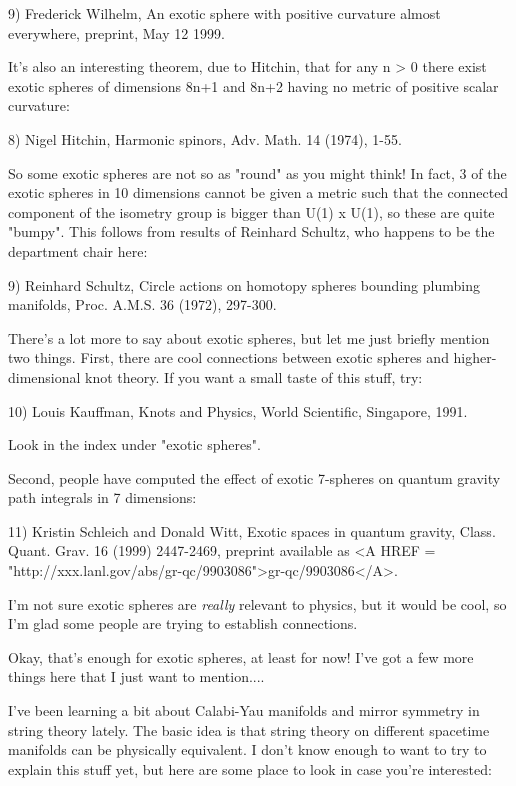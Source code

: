 9) Frederick Wilhelm, An exotic sphere with positive curvature 
almost everywhere, preprint, May 12 1999.

It's also an interesting theorem, due to Hitchin, that for any n > 0
there exist exotic spheres of dimensions 8n+1 and 8n+2 having no metric
of positive scalar curvature:

8) Nigel Hitchin, Harmonic spinors, Adv. Math. 14 (1974), 1-55.
 
So some exotic spheres are not so as "round" as you might think!   
In fact, 3 of the exotic spheres in 10 dimensions cannot be given a 
metric such that the connected component of the isometry group is 
bigger than U(1) x U(1), so these are quite "bumpy".  This follows 
from results of Reinhard Schultz, who happens to be the department 
chair here:

9) Reinhard Schultz, Circle actions on homotopy spheres bounding
plumbing manifolds, Proc. A.M.S. 36 (1972), 297-300.

There's a lot more to say about exotic spheres, but let me just
briefly mention two things.  First, there are cool connections 
between exotic spheres and higher-dimensional knot theory.  If 
you want a small taste of this stuff, try:

10) Louis Kauffman, Knots and Physics, World Scientific, Singapore,
1991.

Look in the index under "exotic spheres".   

Second, people have computed the effect of exotic 7-spheres on 
quantum gravity path integrals in 7 dimensions:

11) Kristin Schleich and Donald Witt, Exotic spaces in quantum 
gravity, Class. Quant. Grav. 16 (1999) 2447-2469, preprint available 
as <A HREF = "http://xxx.lanl.gov/abs/gr-qc/9903086">gr-qc/9903086</A>.

I'm not sure exotic spheres are \emph{really} relevant to physics, but
it would be cool, so I'm glad some people are trying to establish
connections.

Okay, that's enough for exotic spheres, at least for now!  I've got 
a few more things here that I just want to mention....

I've been learning a bit about Calabi-Yau manifolds and mirror
symmetry in string theory lately.  The basic idea is that string
theory on different spacetime manifolds can be physically equivalent.
I don't know enough to want to try to explain this stuff yet, but here 
are some place to look in case you're interested:

